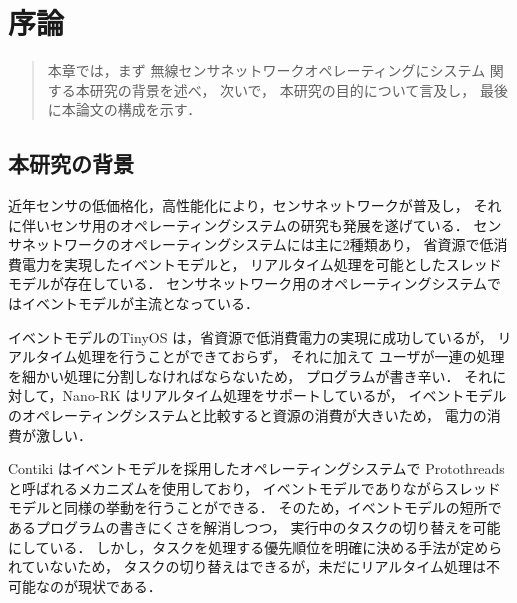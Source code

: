 \chapter{序論}
\begin{large}
\begin{quote}
本章では，まず
無線センサネットワークオペレーティングにシステム
関する本研究の背景を述べ，
次いで，
本研究の目的について言及し，
最後に本論文の構成を示す．
\end{quote}
\end{large}
\clearpage

\section{本研究の背景}
近年センサの低価格化，高性能化により，センサネットワークが普及し，
それに伴いセンサ用のオペレーティングシステムの研究も発展を遂げている．
センサネットワークのオペレーティングシステムには主に2種類あり，
省資源で低消費電力を実現したイベントモデルと，
リアルタイム処理を可能としたスレッドモデルが存在している．
センサネットワーク用のオペレーティングシステムではイベントモデルが主流となっている．

イベントモデルのTinyOS\cite{Hill:2000:SAD:356989.356998}\cite{Levis04tinyos:an}
は，省資源で低消費電力の実現に成功しているが，
リアルタイム処理を行うことができておらず，
それに加えて
ユーザが一連の処理を細かい処理に分割しなければならないため，
プログラムが書き辛い．
それに対して，Nano-RK\cite{Eswaran:2005:NER:1106608.1106672}
はリアルタイム処理をサポートしているが，
イベントモデルのオペレーティングシステムと比較すると資源の消費が大きいため，
電力の消費が激しい．

Contiki\cite{Dunkels:2004:CLF:1032658.1034117}
はイベントモデルを採用したオペレーティングシステムで
Protothreads\cite{Dunkels:2006:PSE:1182807.1182811} 
と呼ばれるメカニズムを使用しており，
イベントモデルでありながらスレッドモデルと同様の挙動を行うことができる．
そのため，イベントモデルの短所であるプログラムの書きにくさを解消しつつ，
実行中のタスクの切り替えを可能にしている．
しかし，タスクを処理する優先順位を明確に決める手法が定められていないため，
タスクの切り替えはできるが，未だにリアルタイム処理は不可能なのが現状である．


